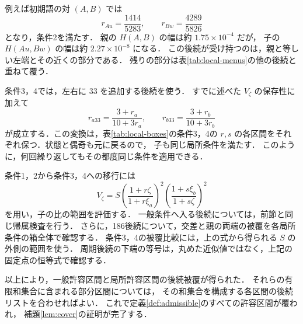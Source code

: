 \documentclass[11pt,a4paper]{article}
\theoremstyle{definition}
\begin{document}
例えば初期語の対 $(A,B)$ では
\[
 r_{Au}=\frac{1414}{5283},\qquad r_{Bw}=\frac{4289}{5826}
\]
となり，条件2を満たす．
親の $H(A,B)$ の幅は約 $1.75\times10^{-4}$ だが，
子の $H(Au,Bw)$ の幅は約 $2.27\times10^{-8}$ になる．
この後続が受け持つのは，親と等しい左端とその近くの部分である．
残りの部分は表\ref{tab:local-menus}の他の後続と重ねて覆う．

条件3，4では，左右に $33$ を追加する後続を使う．
すでに述べた $V_\zeta$ の保存性に加えて
\[
 r_{a33}=\frac{3+r_a}{10+3r_a},\qquad
 r_{b33}=\frac{3+r_b}{10+3r_b}
\]
が成立する．この変換は，表\ref{tab:local-boxes}の条件3，4の
$r,s$ の各区間をそれぞれ保つ．状態と偶奇も元に戻るので，
子も同じ局所条件を満たす．
このように，何回繰り返してもその都度同じ条件を適用できる．

条件1，2から条件3，4への移行には
\[
 V_\zeta
 =S\left(\frac{1+r\zeta}{1+r\xi_a}\right)^2
    \left(\frac{1+s\xi_b}{1+s\zeta}\right)^2
\]
を用い，子の比の範囲を評価する．
一般条件へ入る後続については，前節と同じ帰属検査を行う．
さらに，186後続について，交差と親の両端の被覆を各局所条件の箱全体で確認する．
条件3，4の被覆比較には，上の式から得られる $S$ の外側の範囲を使う．
周期後続の下端の等号は，丸めた近似値ではなく，上記の固定点の恒等式で確認する．

以上により，一般許容区間と局所許容区間の後続被覆が得られた．
それらの有限和集合に含まれる部分区間については，
その和集合を構成する各区間の後続リストを合わせればよい．
これで定義\ref{def:admissible}のすべての許容区間が覆われ，
補題\ref{lem:cover}の証明が完了する．
\end{document}
